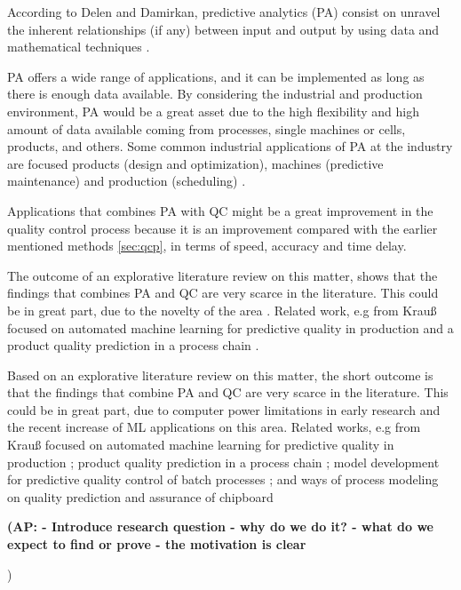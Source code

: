 \documentclass[5p,times,procedia]{elsarticle}
\newcommand{\AP}[1]{{\color{blue} {\bf (AP: #1)}}}
\begin{document}
According to Delen and Damirkan, predictive analytics (PA) consist on unravel the inherent relationships (if any) between input and output by using data and mathematical techniques \cite{delen2013data}.

PA offers a wide range of applications, and it can be implemented as long as there is enough data available. By considering the industrial and production environment, PA would be a great asset due to the high flexibility and high amount of data available coming from processes, single machines or cells, products, and others. Some common industrial applications of PA at the industry are focused products (design and optimization), machines (predictive maintenance) and production (scheduling) \cite{krauss2019machine}.

Applications that combines PA with QC might be a great improvement in the quality control process because it is an improvement compared with the earlier mentioned methods \ref{sec:qcp}, in terms of speed, accuracy and time delay. 

The outcome of an explorative literature review on this matter, shows that the findings that combines PA and QC are very scarce in the literature. This could be in great part, due to the novelty of the area \cite{aumi2012model, ritter1992neue}. Related work, e.g from Krauß focused on automated machine learning for predictive quality in production \cite{krauss2020automated} and a product quality prediction in a process chain \cite{krauss2019machine}. 

Based on an explorative literature review on this matter, the short outcome is that the findings that combine PA and QC are very scarce in the literature. This could be in great part, due to computer power limitations in early research and the recent increase of ML applications on this area. Related works, e.g from Krauß focused on automated machine learning for predictive quality in production \cite{krauss2020automated}; product quality prediction in a process chain \cite{krauss2019machine}; model development for predictive quality control of batch processes \cite{aumi2012model}; and ways of process modeling on quality prediction and assurance of chipboard \cite{ritter1992neue}

\AP{
       - Introduce research question
       - why do we do it?
       - what do we expect to find or prove
       - the motivation is clear
       
       }


      
       
\end{document}
